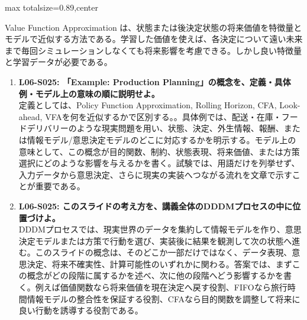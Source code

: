\begin{minipage}[t]{0.58\textwidth}
\begin{adjustbox}{max totalsize={\textwidth}{0.89\textheight},center}
\begin{minipage}{\textwidth}
Value Function Approximation は、状態または後決定状態の将来価値を特徴量とモデルで近似する方法である。学習した価値を使えば、各決定について遠い未来まで毎回シミュレーションしなくても将来影響を考慮できる。しかし良い特徴量と学習データが必要である。\par{}\begin{enumerate}\item \textbf{L06-S025: 「Example: Production Planning」の概念を、定義・具体例・モデル上の意味の順に説明せよ。}\\定義としては、Policy Function Approximation, Rolling Horizon, CFA, Look-ahead, VFAを何を近似するかで区別する。。具体例では、配送・在庫・フードデリバリーのような現実問題を用い、状態、決定、外生情報、報酬、または情報モデル/意思決定モデルのどこに対応するかを明示する。モデル上の意味として、この概念が目的関数、制約、状態表現、将来価値、または方策選択にどのような影響を与えるかを書く。試験では、用語だけを列挙せず、入力データから意思決定、さらに現実の実装へつながる流れを文章で示すことが重要である。\item \textbf{L06-S025: このスライドの考え方を、講義全体のDDDMプロセスの中に位置づけよ。}\\DDDMプロセスでは、現実世界のデータを集約して情報モデルを作り、意思決定モデルまたは方策で行動を選び、実装後に結果を観測して次の状態へ進む。このスライドの概念は、そのどこか一部だけではなく、データ表現、意思決定、将来不確実性、計算可能性のいずれかに関わる。答案では、まずこの概念がどの段階に属するかを述べ、次に他の段階へどう影響するかを書く。例えば価値関数なら将来価値を現在決定へ戻す役割、FIFOなら旅行時間情報モデルの整合性を保証する役割、CFAなら目的関数を調整して将来に良い行動を誘導する役割である。\end{enumerate}
\end{minipage}
\end{adjustbox}
\end{minipage}


